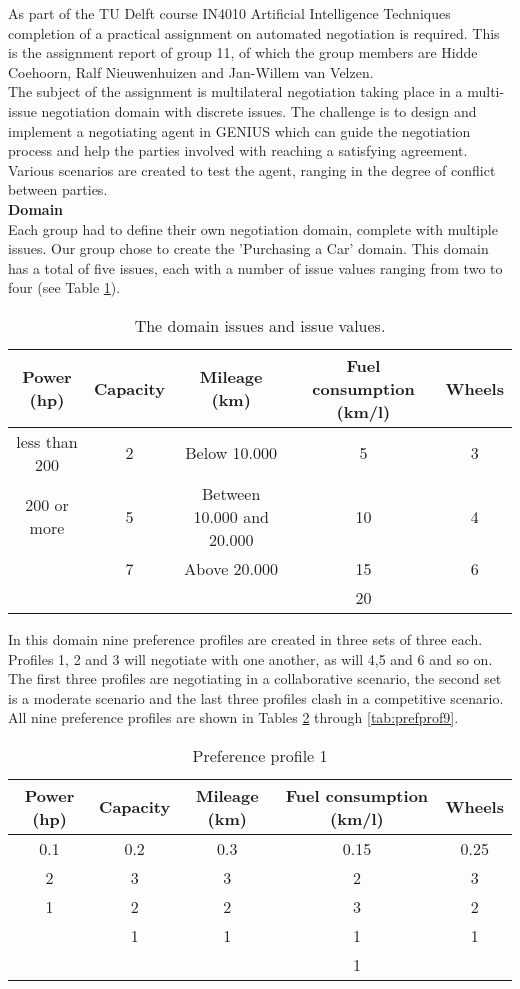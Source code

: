 \documentclass[11pt,a4paper]{report}
\begin{document}
As part of the TU Delft course IN4010 Artificial Intelligence Techniques completion of a practical assignment on automated negotiation is required. This is the assignment report of group 11, of which the group members are Hidde Coehoorn, Ralf Nieuwenhuizen and Jan-Willem van Velzen.\\

The subject of the assignment is multilateral negotiation taking place in a multi-issue negotiation domain with discrete issues. The challenge is to design and implement a negotiating agent in GENIUS which can guide the negotiation process and help the parties involved with reaching a satisfying agreement. Various scenarios are created to test the agent, ranging in the degree of conflict between parties.\\

\textbf{Domain}\\
Each group had to define their own negotiation domain, complete with multiple issues. Our group chose to create the 'Purchasing a Car' domain. This domain has a total of five issues, each with a number of issue values ranging from two to four (see Table \ref{tab:domainissues}).

\begin{table}[H]
\centering
\caption{The domain issues and issue values.}
\label{tab:domainissues}
\begin{tabular}{|c|c|c|c|c|}
\hline
Power (hp) & Capacity & Mileage (km) & Fuel consumption (km/l) & Wheels \\
\hline
less than 200 & 2 & Below 10.000 & 5 & 3 \\
200 or more & 5 & Between 10.000 and 20.000 & 10 & 4 \\
& 7 & Above 20.000 & 15 & 6 \\
& & & 20 & \\ 
\hline
\end{tabular}
\end{table}


In this domain nine preference profiles are created in three sets of three each. Profiles 1, 2 and 3 will negotiate with one another, as will 4,5 and 6 and so on. The first three profiles are negotiating in a collaborative scenario, the second set is a moderate scenario and the last three profiles clash in a competitive scenario. All nine preference profiles are shown in Tables \ref{tab:prefprof1} through \ref{tab:prefprof9}.

\newpage


\begin{table}[H]
\centering
\caption{Preference profile 1}
\label{tab:prefprof1}
\begin{tabular}{|c|c|c|c|c|}
\hline
Power (hp) & Capacity & Mileage (km) & Fuel consumption (km/l) & Wheels \\
\hline
0.1 & 0.2 & 0.3 & 0.15 & 0.25 \\
\hline
2 & 3 & 3 & 2 & 3 \\
1 & 2 & 2 & 3 & 2 \\
  & 1 & 1 & 1 & 1 \\
  &   &   & 1 &   \\ 
\hline
\end{tabular}
\end{table}
\end{document}
